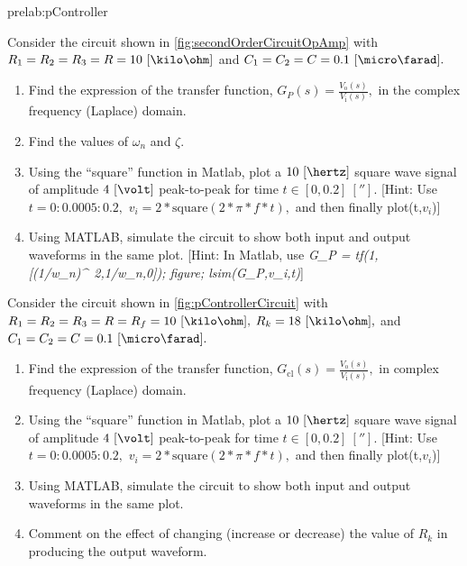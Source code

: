 \begin{prelab}{prelab:pController}
  
Consider the circuit shown in \autoref{fig:secondOrderCircuitOpAmp} with $R_1=R_2 =R_3 = R = 10~[\kilo\ohm]$  and $C_1= C_2=C=0.1~[\micro\farad].$ %
%
\begin{enumerate}
\item Find the  expression of the transfer function, $G_P(s) = \frac{V_{\mathrm{o}}(s)}{V_{\mathrm{i}}(s)},$ in the complex frequency (Laplace) domain. %
\item Find the  values of $\omega_n$ and $\zeta.$  
\item Using the ``square'' function in Matlab, plot a $10~[\hertz]$ square wave signal of amplitude $4~[\volt]$ peak-to-peak for time $t\in[0,0.2]~[\second].$ [Hint: Use $t=0:0.0005:0.2,$ $v_i = 2*\mathrm{square}(2*\pi*f*t),$ and then finally plot(t,$v_i$)] %
%
\item Using MATLAB, simulate the circuit to show both input and output waveforms in the same plot. [Hint: In Matlab, use \emph{G\_P = tf(1,[(1/w\_n)\^~2,1/w\_n,0]); figure; lsim(G\_P,v\_i,t)}] %
\end{enumerate}

Consider the circuit shown in \autoref{fig:pControllerCircuit} with $R_1=R_2 =R_3 = R =R_f= 10~[\kilo\ohm],$ $R_k=18~[\kilo\ohm],$  and $C_1= C_2=C=0.1~[\micro\farad].$ %
%
\begin{enumerate}
\item Find the  expression of the transfer function, $G_{\text{cl}}(s) = \frac{V_{\mathrm{o}}(s)}{V_{\mathrm{i}}(s)},$ in complex frequency (Laplace) domain.

\item Using the ``square'' function in Matlab, plot a $10~[\hertz]$ square wave signal of amplitude $4~[\volt]$ peak-to-peak for time $t\in[0,0.2]~[\second].$ [Hint: Use $t=0:0.0005:0.2,$ $v_i = 2*\mathrm{square}(2*\pi*f*t),$ and then finally plot(t,$v_i$)] 
  
\item Using MATLAB, simulate the circuit to show both input and output waveforms in the same plot. 

\item Comment on the effect of changing (increase or decrease) the value of $R_k$ in producing the output waveform.     
\end{enumerate}

\end{prelab}

